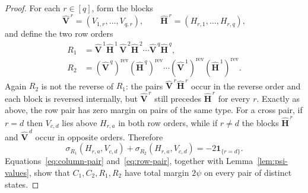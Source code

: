 \documentclass[10pt,a4paper]{amsart}
\newcommand{\one}{\mathbf{1}}
\newcommand{\rev}{\mathrm{rev}}
\begin{document}
\begin{proof}
For each $r\in[q]$, form the blocks
\[
  \widehat{\mathbf V}^{\,r}=(V_{1,r},\ldots,V_{q,r}),
  \qquad
  \widehat{\mathbf H}^{\,r}=(H_{r,1},\ldots,H_{r,q}),
\]
and define the two row orders
\begin{align*}
  R_1&=\widehat{\mathbf V}^{\,1}\widehat{\mathbf H}^{\,1}\,
       \widehat{\mathbf V}^{\,2}\widehat{\mathbf H}^{\,2}\cdots
       \widehat{\mathbf V}^{\,q}\widehat{\mathbf H}^{\,q},\\
  R_2&=(\widehat{\mathbf V}^{\,q})^{\rev}
       (\widehat{\mathbf H}^{\,q})^{\rev}\cdots
       (\widehat{\mathbf V}^{\,1})^{\rev}
       (\widehat{\mathbf H}^{\,1})^{\rev}.
\end{align*}
Again $R_2$ is not the reverse of $R_1$: the pairs
$\widehat{\mathbf V}^{\,r}\widehat{\mathbf H}^{\,r}$ occur in the
reverse order and each block is reversed internally, but
$\widehat{\mathbf V}^{\,r}$ still precedes $\widehat{\mathbf H}^{\,r}$
for every $r$.  Exactly as above, the row pair has zero margin on pairs
of the same type.  For a cross pair, if $r=d$ then $V_{c,d}$ lies above
$H_{r,a}$ in both row orders, while if $r\ne d$ the blocks
$\widehat{\mathbf H}^{\,r}$ and $\widehat{\mathbf V}^{\,d}$ occur in
opposite orders.  Therefore
\begin{equation}\label{eq:row-pair}
  \sigma_{R_1}(H_{r,a},V_{c,d})+
  \sigma_{R_2}(H_{r,a},V_{c,d})
  =-2\one_{\{r=d\}}.
\end{equation}
Equations~\eqref{eq:column-pair} and~\eqref{eq:row-pair}, together with
Lemma~\ref{lem:psi-values}, show that $C_1,C_2,R_1,R_2$ have total
margin $2\psi$ on every pair of distinct states.
\end{proof}
\end{document}
